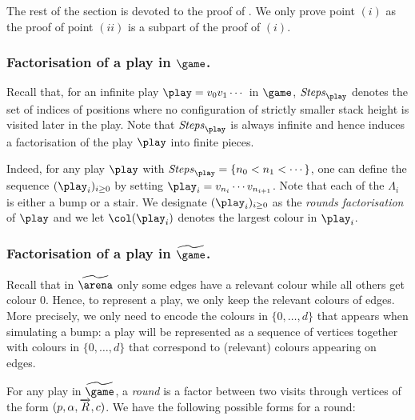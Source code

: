 The rest of the section is devoted to the proof of . We only prove point $(i)$ as the proof of point $(ii)$ is a subpart of the proof of $(i)$.

\subsubsection{Factorisation of a play in $\game$.}

Recall that, for an infinite play $\play=v_0v_1\cdots$ in $\game$, 
$\Stepsg{\play}$ denotes the set of indices of positions where no
configuration of strictly smaller stack height is visited later in the
play. 
Note that $\Stepsg{\play}$ is always
infinite and hence induces a factorisation of the play $\play$ into
finite pieces. 

Indeed, for any play $\play$ with $\Stepsg{\play}=\{n_0<n_1<\cdots\}$, one can define the sequence $(\play_i)_{i\geq
0}$ by setting ${\play}_i=v_{n_i}\cdots v_{n_{i+1}}$. Note that each of the $\Lambda_i$ is either a bump or a stair.
We designate $(\play_i)_{i\geq 0}$ as the \emph{rounds factorisation} of $\play$ and we let $\pdscol{\play_i}$ denotes the largest colour in $\play_i$.



\subsubsection{Factorisation of a play in $\fgame$.}

Recall that in $\farena$ only some edges have a relevant colour while all others get colour $0$. Hence, to represent a play, we
only keep the relevant colours of edges. More precisely, we only need to encode the
colours in $\{0,\dots,d\}$ that appears when simulating a bump: a play will be
represented as a sequence of vertices together with colours in
$\{0,\dots,d\}$ that correspond to (relevant) colours appearing on edges.

For any play in $\fgame$, a \emph{round} is a factor between two
visits through vertices of the form
$(p,\alpha,\overrightarrow{R},c)$. We have the following possible forms for a round:


